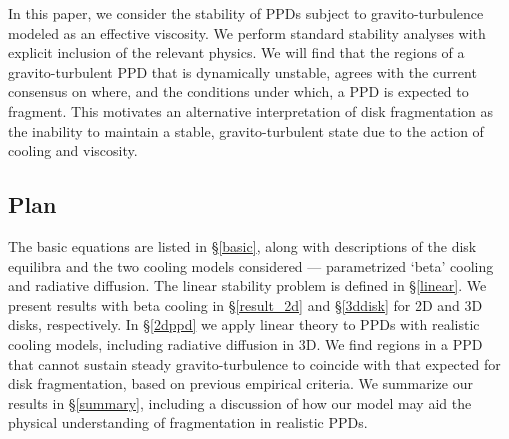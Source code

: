 \documentclass[iop, numberedappendix]{emulateapj}
\begin{document}
In this paper, we consider the stability of PPDs subject to 
gravito-turbulence modeled as an effective viscosity. 
We perform standard stability analyses with explicit inclusion of the
relevant physics. 
We will find that the
regions of a gravito-turbulent PPD that is dynamically unstable,
agrees with the current consensus on where, and the conditions under
which, a PPD is expected to fragment. This motivates an alternative 
interpretation of disk fragmentation as the inability to maintain a
stable, gravito-turbulent state due to the action of cooling and
viscosity.  














\subsection{Plan}

The basic equations are listed in \S\ref{basic}, along with
descriptions of the disk 
equilibra and the two cooling models 
considered --- parametrized `beta' cooling and radiative diffusion. 
The linear stability problem is defined in
\S\ref{linear}. We present results with beta cooling in
\S\ref{result_2d} and \S\ref{3ddisk} for 2D and 3D disks,
respectively. %
In
\S\ref{2dppd} we apply linear theory to PPDs with realistic cooling
models, including radiative diffusion in 3D. We find regions in a
PPD that cannot sustain steady gravito-turbulence to coincide with
that expected for disk fragmentation, based on previous empirical
criteria. We summarize our results in \S\ref{summary}, including a
discussion of how our model may aid the physical understanding of  
fragmentation in realistic PPDs. 





 




\appendix




\end{document}
